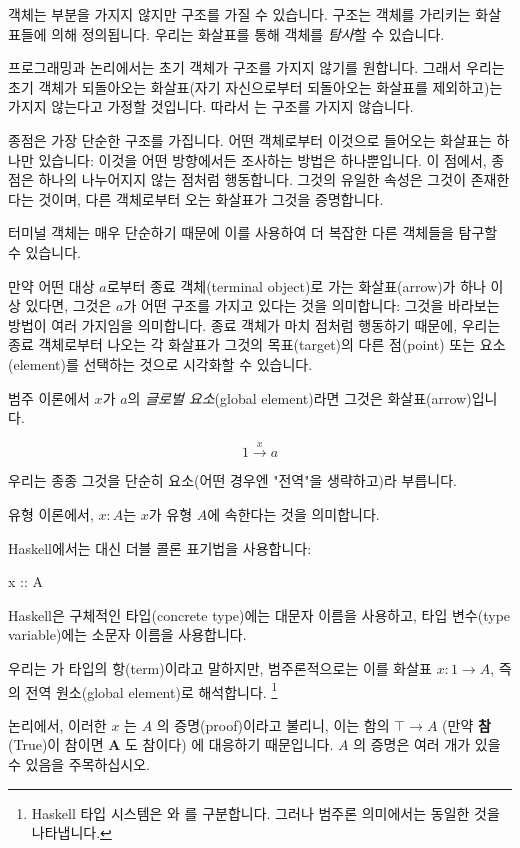 \documentclass[DaoFP]{subfiles}
\begin{document}
객체는 부분을 가지지 않지만 구조를 가질 수 있습니다. 구조는 객체를 가리키는 화살표들에 의해 정의됩니다. 우리는 화살표를 통해 객체를 \emph{탐사}할 수 있습니다.

프로그래밍과 논리에서는 초기 객체가 구조를 가지지 않기를 원합니다. 그래서 우리는 초기 객체가 되돌아오는 화살표(자기 자신으로부터 되돌아오는 화살표를 제외하고)는 가지지 않는다고 가정할 것입니다. 따라서 는 구조를 가지지 않습니다.

종점은 가장 단순한 구조를 가집니다. 어떤 객체로부터 이것으로 들어오는 화살표는 하나만 있습니다: 이것을 어떤 방향에서든 조사하는 방법은 하나뿐입니다. 이 점에서, 종점은 하나의 나누어지지 않는 점처럼 행동합니다. 그것의 유일한 속성은 그것이 존재한다는 것이며, 다른 객체로부터 오는 화살표가 그것을 증명합니다.

터미널 객체는 매우 단순하기 때문에 이를 사용하여 더 복잡한 다른 객체들을 탐구할 수 있습니다.

만약 어떤 대상 $a$로부터 종료 객체(terminal object)로 가는 화살표(arrow)가 하나 이상 있다면, 그것은 $a$가 어떤 구조를 가지고 있다는 것을 의미합니다: 그것을 바라보는 방법이 여러 가지임을 의미합니다. 종료 객체가 마치 점처럼 행동하기 때문에, 우리는 종료 객체로부터 나오는 각 화살표가 그것의 목표(target)의 다른 점(point) 또는 요소(element)를 선택하는 것으로 시각화할 수 있습니다.

범주 이론에서 $ x$가 $a$의 \emph{글로벌 요소}(global element)라면 그것은 화살표(arrow)입니다.

\[ 1 \xrightarrow x a \]

우리는 종종 그것을 단순히 요소(어떤 경우엔 "전역"을 생략하고)라 부릅니다.

유형 이론에서, $ x \colon A$는 $x$가 유형 $A$에 속한다는 것을 의미합니다.

Haskell에서는 대신 더블 콜론 표기법을 사용합니다:
\begin{haskell}
x :: A
\end{haskell}
Haskell은 구체적인 타입(concrete type)에는 대문자 이름을 사용하고, 타입 변수(type variable)에는 소문자 이름을 사용합니다.

우리는 가  타입의 항(term)이라고 말하지만, 범주론적으로는 이를 화살표 $x : 1 \to A$, 즉 의 전역 원소(global element)로 해석합니다. \footnote{Haskell 타입 시스템은 와 를 구분합니다. 그러나 범주론 의미에서는 동일한 것을 나타냅니다.}

논리에서, 이러한 $ x$ 는 $ A$ 의 증명(proof)이라고 불리니, 이는 함의 $ \top \to A$ (만약 \textbf{참}(True)이 참이면 \textbf{A} 도 참이다) 에 대응하기 때문입니다. $A$ 의 증명은 여러 개가 있을 수 있음을 주목하십시오.
\end{document}
